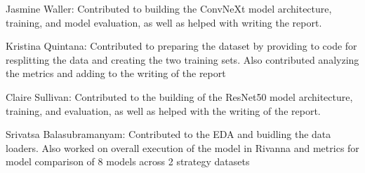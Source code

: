\documentclass[conference]{IEEEtran}
\begin{document}
Jasmine Waller: Contributed to building the ConvNeXt model architecture, training, and model evaluation, as well as helped with writing the report.

Kristina Quintana: Contributed to preparing the dataset by providing to code for resplitting the data and creating the two training sets. Also contributed analyzing the metrics and adding to the writing of the report

Claire Sullivan: Contributed to the building of the ResNet50 model architecture, training, and evaluation, as well as helped with the writing of the report. 

Srivatsa Balasubramanyam: Contributed to the EDA and buidling the data loaders. Also worked on overall execution of the model in Rivanna and metrics for model comparison of 8 models across 2 strategy datasets

  
         

\end{document}
